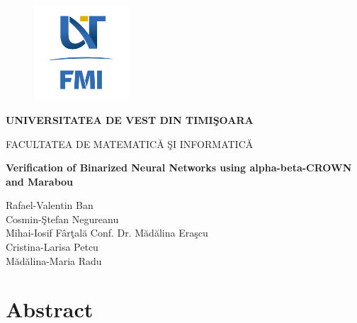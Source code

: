 \documentclass[12pt,a4paper]{report}
\begin{document}
\thispagestyle{empty}
\begin{center}
\begin{figure}[h!]
\vspace{-20pt}
\begin{center}
\includegraphics[width=100pt]{FMI-03.png}
\end{center}
\end{figure}

{\large{\bf UNIVERSITATEA DE VEST DIN TIMI\c SOARA

FACULTATEA DE MATEMATIC\u A \c SI INFORMATIC\u A}}

\vspace{65pt}
{\huge {\bf Verification of Binarized Neural Networks using alpha-beta-CROWN and Marabou}}

\vspace{65pt}
\end{center}

\noindent Rafael-Valentin Ban\\
\noindent Cosmin-\c Stefan Negureanu\\
\noindent Mihai-Iosif F\^{a}r\c tal\u a \hfill Conf. Dr. M\u ad\u alina Era\c scu\\
\noindent Cristina-Larisa Petcu\\
\noindent M\u ad\u alina-Maria Radu\\


\newpage
\section*{Abstract}


\tableofcontents
\end{document}
